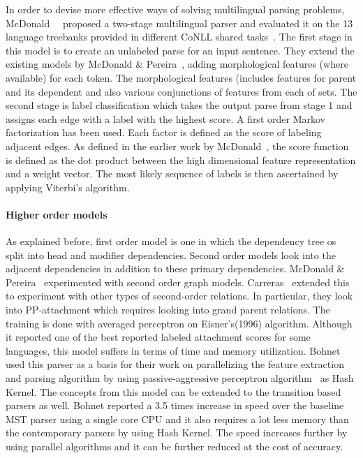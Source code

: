 In order to devise more effective ways of solving multilingual parsing problems, McDonald~\etal~\cite{McDonald:2006:MDA:1596276.1596317} proposed a two-stage multilingual parser and evaluated it on the 13 language treebanks provided in different CoNLL shared tasks~\cite{Buchholz:2006:CST:1596276.1596305}. The first stage in this model is to create an unlabeled parse for an input sentence. They extend the existing models by McDonald \& Pereira~\cite{mcdonald2006online}, adding morphological features (where available) for each token. The morphological features (includes features for parent and its dependent and also various conjunctions of features from each of sets. The second stage is label classification which takes the output parse from stage 1 and assigns each edge with a label with the highest score. A first order Markov factorization has been used. Each factor is defined as the score of labeling adjacent edges. As defined in the earlier work by McDonald~\etal, the score function is defined as the dot product between the high dimensional feature representation and a weight vector. The most likely sequence of labels is then  ascertained by applying Viterbi's algorithm.



\paragraph{Higher order models}

As explained before, first order model is one in which the dependency tree os split into head and modifier dependencies. Second order models look into the adjacent dependencies in addition to these primary dependencies. McDonald \& Pereira~\cite{mcdonald2006online} experimented with second order graph models. Carreras~\cite{carreras2007experiments} extended this to experiment with other types of second-order relations. In particular, they look into PP-attachment which requires looking into grand parent relations. The training is done with averaged perceptron on Eisner's(1996) algorithm. Although it reported one of the best reported labeled attachment scores for some languages, this model suffers in terms of time and memory utilization. Bohnet~\cite{bohnet2010very} used this parser as a basis for their work on parallelizing the feature extraction and parsing algorithm by using passive-aggressive perceptron algorithm~\cite{crammer2006online} as Hash Kernel. The concepts from this model can be extended to the transition based parsers as well. Bohnet reported a 3.5 times increase in speed over the baseline MST parser using a single core CPU and it also requires a lot less memory than the contemporary parsers by using Hash Kernel. The speed increases further by using parallel algorithms and it can be further reduced at the cost of accuracy.


